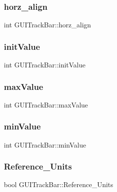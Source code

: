 \subsubsection{\texorpdfstring{horz\+\_\+align}{horz\_align}}
{\footnotesize\ttfamily int G\+U\+I\+Track\+Bar\+::horz\+\_\+align}

\hypertarget{class_g_u_i_track_bar_a517eb53e3b733f3b291958778906e32b}{}\label{class_g_u_i_track_bar_a517eb53e3b733f3b291958778906e32b} 
\subsubsection{\texorpdfstring{init\+Value}{initValue}}
{\footnotesize\ttfamily int G\+U\+I\+Track\+Bar\+::init\+Value}

\hypertarget{class_g_u_i_track_bar_a4b35512ac6cda45daee5d317ba6c729a}{}\label{class_g_u_i_track_bar_a4b35512ac6cda45daee5d317ba6c729a} 
\subsubsection{\texorpdfstring{max\+Value}{maxValue}}
{\footnotesize\ttfamily int G\+U\+I\+Track\+Bar\+::max\+Value}

\hypertarget{class_g_u_i_track_bar_a46f8a1aea46302d179de091cc052f597}{}\label{class_g_u_i_track_bar_a46f8a1aea46302d179de091cc052f597} 
\subsubsection{\texorpdfstring{min\+Value}{minValue}}
{\footnotesize\ttfamily int G\+U\+I\+Track\+Bar\+::min\+Value}

\hypertarget{class_g_u_i_track_bar_a16885097674b30182dd45113c8cdea73}{}\label{class_g_u_i_track_bar_a16885097674b30182dd45113c8cdea73} 
\subsubsection{\texorpdfstring{Reference\+\_\+\+Units}{Reference\_Units}}
{\footnotesize\ttfamily bool G\+U\+I\+Track\+Bar\+::\+Reference\+\_\+\+Units}

